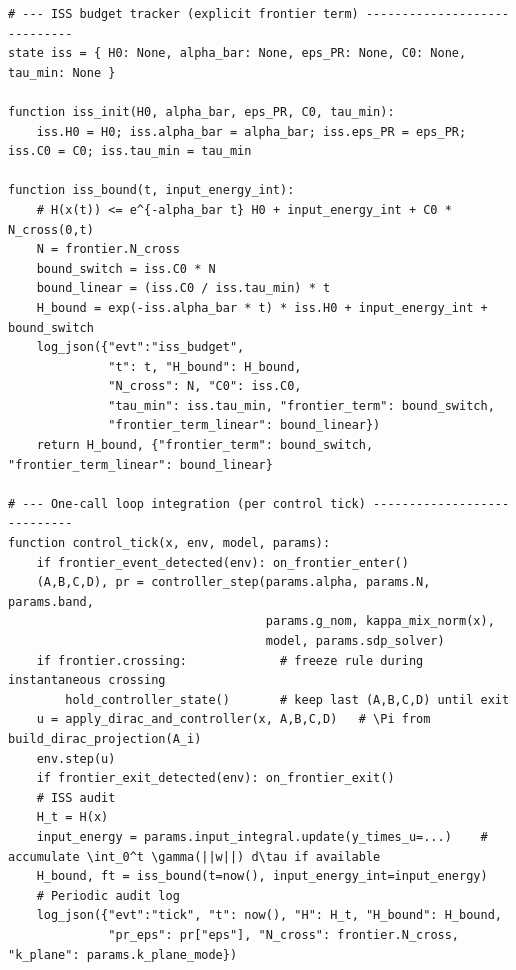 \begin{lstlisting}
# --- ISS budget tracker (explicit frontier term) -----------------------------
state iss = { H0: None, alpha_bar: None, eps_PR: None, C0: None, tau_min: None }

function iss_init(H0, alpha_bar, eps_PR, C0, tau_min):
    iss.H0 = H0; iss.alpha_bar = alpha_bar; iss.eps_PR = eps_PR; iss.C0 = C0; iss.tau_min = tau_min

function iss_bound(t, input_energy_int):
    # H(x(t)) <= e^{-alpha_bar t} H0 + input_energy_int + C0 * N_cross(0,t)
    N = frontier.N_cross
    bound_switch = iss.C0 * N
    bound_linear = (iss.C0 / iss.tau_min) * t
    H_bound = exp(-iss.alpha_bar * t) * iss.H0 + input_energy_int + bound_switch
    log_json({"evt":"iss_budget",
              "t": t, "H_bound": H_bound,
              "N_cross": N, "C0": iss.C0,
              "tau_min": iss.tau_min, "frontier_term": bound_switch,
              "frontier_term_linear": bound_linear})
    return H_bound, {"frontier_term": bound_switch, "frontier_term_linear": bound_linear}

# --- One-call loop integration (per control tick) ----------------------------
function control_tick(x, env, model, params):
    if frontier_event_detected(env): on_frontier_enter()
    (A,B,C,D), pr = controller_step(params.alpha, params.N, params.band,
                                    params.g_nom, kappa_mix_norm(x),
                                    model, params.sdp_solver)
    if frontier.crossing:             # freeze rule during instantaneous crossing
        hold_controller_state()       # keep last (A,B,C,D) until exit
    u = apply_dirac_and_controller(x, A,B,C,D)   # \Pi from build_dirac_projection(A_i)
    env.step(u)
    if frontier_exit_detected(env): on_frontier_exit()
    # ISS audit
    H_t = H(x)
    input_energy = params.input_integral.update(y_times_u=...)    # accumulate \int_0^t \gamma(||w||) d\tau if available
    H_bound, ft = iss_bound(t=now(), input_energy_int=input_energy)
    # Periodic audit log
    log_json({"evt":"tick", "t": now(), "H": H_t, "H_bound": H_bound,
              "pr_eps": pr["eps"], "N_cross": frontier.N_cross, "k_plane": params.k_plane_mode})
\end{lstlisting}

